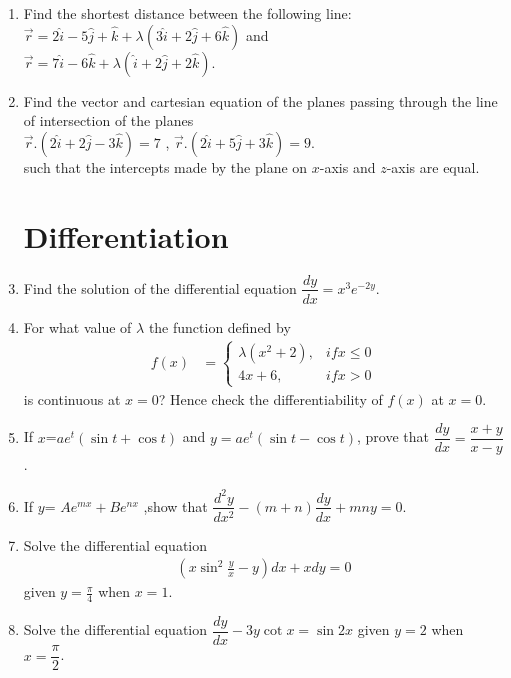 \documentclass[10pt,-letter paper]{article}
\providecommand{\brak}[1]{\ensuremath{\left(#1\right)}}
\begin{document}
\begin{enumerate}
\item Find the shortest distance between the following line:
$\overrightarrow{r}=2\hat{i}-5\hat{j}+\hat{k}+\lambda\brak{3\hat{i}+2\hat{j}+6\hat{k}}$ and \\
$\overrightarrow{r}=7\hat{i}-6\hat{k}+\lambda\brak{\hat{i}+2\hat{j}+2\hat{k}}$.

\item Find the vector and cartesian equation of the planes passing through the line of intersection of the planes\\
$\overrightarrow{r}.\brak{2\hat{i}+2\hat{j}-3\hat{k}}=7 $ , $\overrightarrow{r}.\brak{2\hat{i}+5\hat{j}+3\hat{k}}=9 $.\\
such that the intercepts made by the plane on $x$-axis and $z$-axis are equal.\\

\section{Differentiation}

\item Find the solution of the differential equation $\dfrac{dy}{dx} = x^{3}e^{-2y}$.\\

\item For what value of $\lambda$ the function defined by 
\begin{align*} f(x) &= \begin{cases}\lambda\brak{x^2 +2},&if x\leq0 \\ 4x+6 , &if x>0 \end{cases} \end{align*}
is continuous at $x=0$? Hence check the differentiability of $f(x)$ at $x=0$.\\

\item If $x$=$ae^t\brak{\sin{t}+\cos{t}}$ and $y=ae^t \brak{\sin{t}-\cos{t}}$, prove that $\dfrac{dy}{dx} = \dfrac{x+y}{x-y}$.\\

\item If $y$= $Ae^{mx}+Be^{nx}$ ,show that $\dfrac{d^2 y}{dx^2}-\brak{m+n}\dfrac{dy}{dx} + mny = 0$.\\

\item Solve the differential equation \\
\begin{align*}
\brak{x \sin^2{\frac{y}{x}}-y}dx + xdy =0
\end{align*}
given $y = \frac{\pi}{4}$ when $x=1$.\\
\item Solve the differential equation $\dfrac{dy}{dx}- 3y\cot{x} = \sin{2x}$ given $y=2$ when $x=\dfrac{\pi}{2}$.\\


\end{enumerate}
\end{document}
